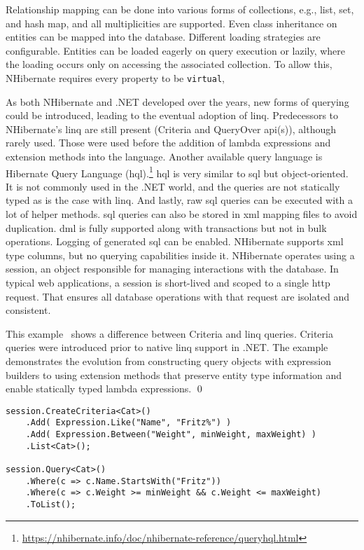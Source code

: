 Relationship mapping can be done into various forms of collections, e.g., list, set, and hash map, and all multiplicities are supported. Even class inheritance on entities can be mapped into the database. Different loading strategies are configurable. Entities can be loaded eagerly on query execution or lazily, where the loading occurs only on accessing the associated collection. To allow this, NHibernate requires every property to be \texttt{virtual},

As both NHibernate and .NET developed over the years, new forms of querying could be introduced, leading to the eventual adoption of \acrshort{linq}. Predecessors to NHibernate's \acrshort{linq} are still present (Criteria and QueryOver \acrshort{api}(s)), although rarely used. Those were used before the addition of lambda expressions and extension methods into the language. Another available query language is Hibernate Query Language (\acrshort{hql}).\footnote{\url{https://nhibernate.info/doc/nhibernate-reference/queryhql.html}} \acrshort{hql} is very similar to \acrshort{sql} but object-oriented. It is not commonly used in the .NET world, and the queries are not statically typed as is the case with \acrshort{linq}. And lastly, raw \acrshort{sql} queries can be executed with a lot of helper methods. \acrshort{sql} queries can also be stored in \acrshort{xml} mapping files to avoid duplication. \acrshort{dml} is fully supported along with transactions but not in bulk operations. Logging of generated \acrshort{sql} can be enabled. NHibernate supports \acrshort{xml} type columns, but no querying capabilities inside it. NHibernate operates using a session, an object responsible for managing interactions with the database. In typical web applications, a session is short-lived and scoped to a single \acrshort{http} request. That ensures all database operations with that request are isolated and consistent.

\begin{example}
\small
This example~\cite{nhibernate} shows a difference between Criteria and \acrshort{linq} queries. Criteria queries were introduced prior to native \acrshort{linq} support in .NET. The example demonstrates the evolution from constructing query objects with expression builders to using extension methods that preserve entity type information and enable statically typed lambda expressions.
\qed

\begin{lstlisting}[language=CSharp]
session.CreateCriteria<Cat>()
    .Add( Expression.Like("Name", "Fritz%") )
    .Add( Expression.Between("Weight", minWeight, maxWeight) )
    .List<Cat>();

session.Query<Cat>()
    .Where(c => c.Name.StartsWith("Fritz"))
    .Where(c => c.Weight >= minWeight && c.Weight <= maxWeight)
    .ToList();
\end{lstlisting}
\end{example}

